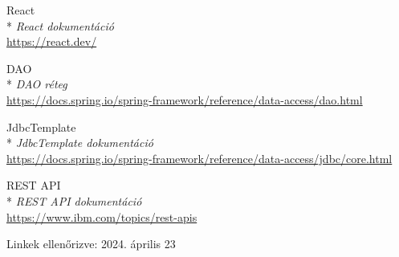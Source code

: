 \begin{thebibliography}{x}
 React\\*
\textit{React dokumentáció}
\\ \url{https://react.dev/}

 DAO\\*
\textit{DAO réteg}
\\ \url{https://docs.spring.io/spring-framework/reference/data-access/dao.html}

 JdbcTemplate\\*
\textit{JdbcTemplate dokumentáció}
\\ \url{https://docs.spring.io/spring-framework/reference/data-access/jdbc/core.html}

 REST API\\*
\textit{REST API dokumentáció}
\\ \url{https://www.ibm.com/topics/rest-apis}



\end{thebibliography}

Linkek ellenőrizve: 2024. április 23